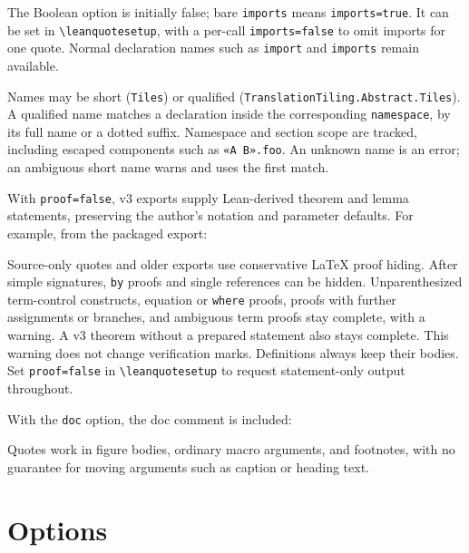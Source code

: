 \documentclass[11pt]{article}
\newcommand{\cs}[1]{\texttt{\textbackslash #1}}
\newcommand{\opt}[1]{\texttt{#1}}
\begin{document}
\leanquote[imports]{}

\noindent The Boolean option is initially false; bare \opt{imports} means
\opt{imports=true}. It can be set in \cs{leanquotesetup}, with a per-call
\opt{imports=false} to omit imports for one quote. Normal declaration names such as
\texttt{import} and \texttt{imports} remain available.

\noindent Names may be short (\texttt{Tiles}) or qualified
(\texttt{TranslationTiling.Abstract.Tiles}). A qualified name matches a declaration inside the
corresponding \texttt{namespace}, by its full name or a dotted suffix. Namespace and section
scope are tracked, including escaped components such as \texttt{«A B».foo}. An unknown name
is an error; an ambiguous short name warns and uses the first match.

With \opt{proof=false}, v3 exports supply Lean-derived theorem and lemma statements,
preserving the author's notation and parameter defaults. For example, from the packaged export:

\begin{latexsrc}
\end{latexsrc}

\noindent Source-only quotes and older exports use conservative \LaTeX{} proof hiding.
After simple signatures, \texttt{by} proofs and single references can be hidden.
Unparenthesized term-control constructs, equation or \texttt{where} proofs, proofs with
further assignments or branches, and ambiguous term proofs stay complete, with a warning.
A v3 theorem without a prepared statement also stays complete. This warning does not change verification marks.
Definitions always keep their bodies. Set \opt{proof=false} in \cs{leanquotesetup} to request
statement-only output throughout.

With the \opt{doc} option, the doc comment is included:

\begin{latexsrc}
\end{latexsrc}

Quotes work in figure bodies, ordinary macro arguments, and footnotes, with no guarantee
for moving arguments such as caption or heading text.

\section{Options}
\end{document}
